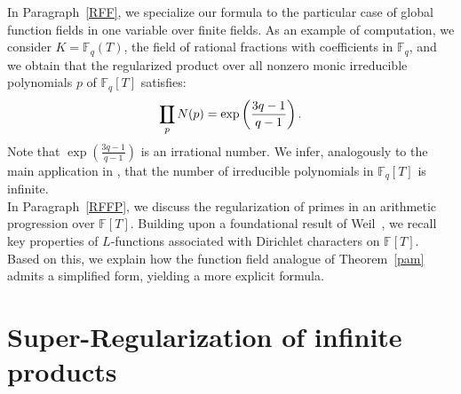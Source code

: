 \documentclass[12pt]{amsart}
\DeclareMathOperator*\Rprod{%
\mathchoice
  {\ooalign{$\displaystyle\prod$\cr\hidewidth$\displaystyle\coprod$\hidewidth\cr}}%
  {\ooalign{$\textstyle\prod$\cr\hidewidth$\textstyle\coprod$\hidewidth\cr}}%
  {\ooalign{$\scriptstyle\prod$\cr\hidewidth$\scriptstyle\coprod$\hidewidth\cr}}%
  {\ooalign{$\scriptscriptstyle\prod$\cr\hidewidth$%
  \scriptscriptstyle\coprod$\hidewidth\cr}}}
\begin{document}
\begin{itemize}
In Paragraph~\ref{RFF}, we  specialize our formula to the particular case of global function fields in one variable over finite fields. As an example of computation, we consider  $K = \mathbb{F}_q(T)$, the field of rational fractions with coefficients in $\mathbb F_q$, and we obtain
that the regularized product over all nonzero monic irreducible polynomials $p$ of $\mathbb F_q[T]$ satisfies:
\[
\Rprod_{p} N(p) = \exp\left( \frac{3q-1}{ q-1} \right).
\]
Note that $\exp\left( \frac{3q-1}{q-1} \right)$ is an irrational number. We infer, analogously to the main application in \cite{Marco_prime}, that the number of irreducible polynomials in $\mathbb{F}_q[T]$ is infinite.\\



In Paragraph~\ref{RFFP}, we discuss the regularization of primes in an arithmetic progression over $\mathbb{F}[T]$. 
Building upon a foundational result of Weil~\cite{Weil_1945}, we recall key properties of $L$-functions associated with Dirichlet characters on $\mathbb{F}[T]$. 
Based on this, we explain how the function field analogue of Theorem~\ref{pam} admits a simplified form, yielding a more explicit formula.










\end{itemize}












\medskip































\section{Super-Regularization of infinite products}\label{SR}
\end{document}
